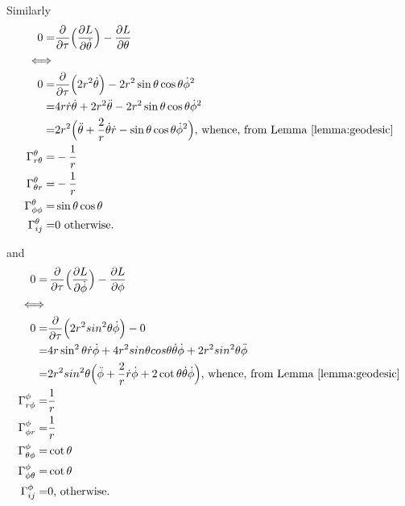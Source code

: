 \documentclass[]{article}
\begin{document}
Similarly
\begin{align*}
0=&\frac{\partial}{\partial \tau}\Big(\frac{\partial L}{\partial \dot{\theta}}\Big)-\frac{\partial L}{\partial \theta}\\
\iff&\\
0=&\frac{\partial}{\partial \tau}\Big(2r^2 \dot {\theta} \Big) -2 r^2 \sin \theta\cos \theta \dot{\phi}^2\\
=&4 r \dot r  \dot{\theta}  + 2 r^2 \ddot \theta -2 r^2 \sin \theta\cos \theta \dot{\phi}^2\\
=& 2r^2\Big(\ddot{\theta}+\frac{2}{r}\dot{\theta}\dot{r} -\sin \theta\cos \theta \dot{\phi}^2\Big)\text{, whence, from Lemma \ref{lemma:geodesic}}\\
\Gamma^{\theta}_{r\theta}=&-\frac{1}{r}\\
\Gamma^{\theta}_{\theta r}=&-\frac{1}{r}\\
\Gamma^{\theta}_{\phi\phi}=&\sin \theta \cos \theta\\
\Gamma^{\theta}_{ij}=&0 \text{ otherwise.}
\end{align*}

and
\begin{align*}
0=&\,\frac{\partial}{\partial \tau}\Big(\frac{\partial L}{\partial \dot{\phi}}\Big)-\frac{\partial L}{\partial \phi}\\
\iff&\\
0=&\frac{\partial}{\partial \tau}\Big( 2 r^2 sin^2\theta \dot{\phi}\Big) - 0\\
=&4 r \sin^2 \theta \dot {r} \dot{\phi}+ 4 r^2 sin\theta cos\theta \dot{\theta} \dot{\phi}+2 r^2 sin^2\theta \ddot{\phi}\\
=& 2 r^2 sin^2\theta \Big(\ddot{\phi} + \frac{2}{r}\dot{r}\dot{\phi} + 2 \cot\theta\dot{\theta}\dot{\phi}\Big)\text{, whence, from Lemma \ref{lemma:geodesic}}\\
\Gamma^{\phi}_{r\phi}=&\frac{1}{r}\\
\Gamma^{\phi}_{\phi r}=&\frac{1}{r}\\
\Gamma^{\phi}_{\theta\phi}=&\cot\theta\\
\Gamma^{\phi}_{\phi\theta}=&\cot\theta\\
\Gamma^{\phi}_{ij}=&0 \text{, otherwise.}
\end{align*}
\end{document}

